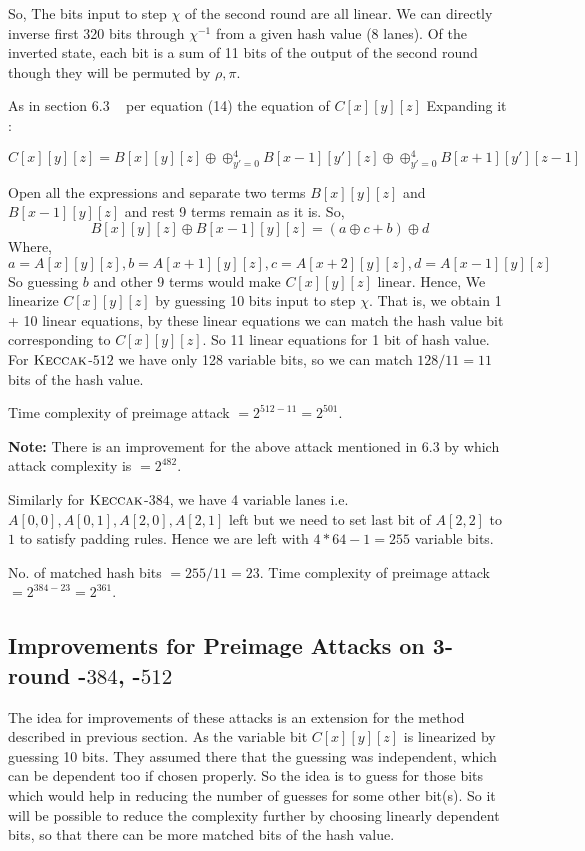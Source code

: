 		So, The bits input to step $\chi$ of the second round are all linear. We can directly inverse first 320 bits through $\chi^{-1}$ from a given hash value (8 lanes). Of the inverted state, each bit is a sum of 11 bits of the output of the second round though they will be permuted by $\rho, \pi$.

    As in section 6.3 ~\cite{guo2016linear} per equation (14) the equation of $C[x][y][z]$
    Expanding it :

    \[
        C[x][y][z] = B[x][y][z] \oplus \oplus_{y' = 0}^{4} B[x-1][y'][z] \oplus \oplus_{y' = 0}^{4} B[x+1][y'][z-1]
    \]
    
		Open all the expressions and separate two terms $B[x][y][z]$ and $B[x-1][y][z]$ and rest 9 terms remain as it is.
    So, 
		\[ B[x][y][z] \oplus B[x-1][y][z] = (a \oplus c + b) \oplus d
    \]
    Where,
		 \[
        a = A[x][y][z], b = A[x + 1][y][z], c = A[x + 2][y][z], d = A[x - 1][y][z]
    \]
    So guessing $b$ and other 9 terms would make $C[x][y][z]$ linear. Hence, We linearize $C[x][y][z]$ by guessing 10 bits input to step $\chi$. That is, we obtain 1 + 10 linear equations, by these linear equations we can match the hash value bit corresponding to $C[x][y][z]$. So 11 linear equations for 1 bit of hash value. For $\mbox{\textsc{Keccak}}$-$512$ we have only 128 variable bits, so we can match $128/11 = 11$ bits of the hash value.
    
    Time complexity of preimage attack $= 2^{512 - 11} = 2^{501}$.

    \textbf{Note:} There is an improvement for the above attack mentioned in 6.3 by which attack complexity is $= 2^{482}$.

    Similarly for $\mbox{\textsc{Keccak}}$-$384$, we have 4 variable lanes i.e. $A[0,0], A[0,1], A[2,0], A[2,1]$ left but we need to set last bit of $A[2,2]$ to $1$ to satisfy padding rules. Hence we are left with $4*64 - 1 = 255$ variable bits.
	
	No. of matched hash bits $ = 255/11 = 23 $. Time complexity of preimage attack $= 2^{384 - 23} = 2^{361}$.

\subsection{Improvements for Preimage Attacks on 3-round \KECCAK-$384$, \KECCAK-$512$}

    The idea for improvements of these attacks is an extension for the method described in previous section. As the variable bit $C[x][y][z]$ is linearized by guessing 10 bits. They assumed there that the guessing was independent, which can be dependent too if chosen properly. So the idea is to guess for those bits which would help in reducing the number of guesses for some other bit(s). So it will be possible to reduce the complexity further by choosing linearly dependent bits, so that there can be more matched bits of the hash value.

